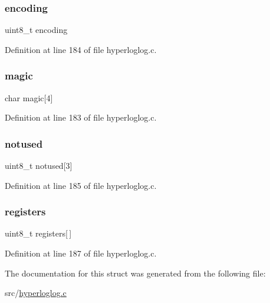 \subsubsection{\texorpdfstring{encoding}{encoding}}
{\footnotesize\ttfamily uint8\+\_\+t encoding}



Definition at line 184 of file hyperloglog.\+c.

\mbox{\label{structhllhdr_a03dedff415badb9581a8ca90e6a45b53}} 
\subsubsection{\texorpdfstring{magic}{magic}}
{\footnotesize\ttfamily char magic\mbox{[}4\mbox{]}}



Definition at line 183 of file hyperloglog.\+c.

\mbox{\label{structhllhdr_a4fe1afde3770cfaeba9ce0e4c3cdf3c6}} 
\subsubsection{\texorpdfstring{notused}{notused}}
{\footnotesize\ttfamily uint8\+\_\+t notused\mbox{[}3\mbox{]}}



Definition at line 185 of file hyperloglog.\+c.

\mbox{\label{structhllhdr_a5ebea196b48e08b90ba84e31f7a516cf}} 
\subsubsection{\texorpdfstring{registers}{registers}}
{\footnotesize\ttfamily uint8\+\_\+t registers\mbox{[}$\,$\mbox{]}}



Definition at line 187 of file hyperloglog.\+c.



The documentation for this struct was generated from the following file\+:\begin{DoxyCompactItemize}
\item 
src/\hyperlink{hyperloglog_8c}{hyperloglog.\+c}\end{DoxyCompactItemize}
